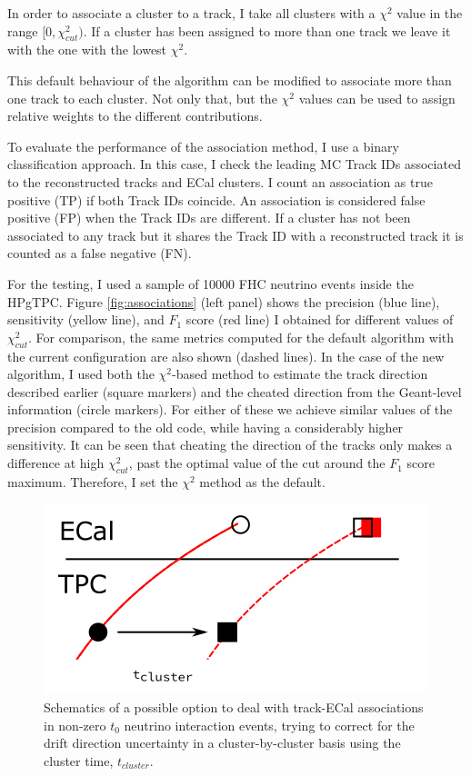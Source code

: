 In order to associate a cluster to a track, I take all clusters with a $\chi^{2}$ value in the range $[0, \chi^{2}_{cut})$. If a cluster has been assigned to more than one track we leave it with the one with the lowest $\chi^{2}$.

This default behaviour of the algorithm can be modified to associate more than one track to each cluster. Not only that, but the $\chi^{2}$ values can be used to assign relative weights to the different contributions.

To evaluate the performance of the association method, I use a binary classification approach. In this case, I check the leading MC Track IDs associated to the reconstructed tracks and ECal clusters. I count an association as true positive (TP) if both Track IDs coincide. An association is considered false positive (FP) when the Track IDs are different. If a cluster has not been associated to any track but it shares the Track ID with a reconstructed track it is counted as a false negative (FN).

For the testing, I used a sample of 10000 FHC neutrino events inside the HPgTPC. Figure \ref{fig:associations} (left panel) shows the precision (blue line), sensitivity (yellow line), and $F_{1}$ score (red line) I obtained for different values of $\chi^{2}_{cut}$. For comparison, the same metrics computed for the default algorithm with the current configuration are also shown (dashed lines). In the case of the new algorithm, I used both the $\chi^{2}$-based method to estimate the track direction described earlier (square markers) and the cheated direction from the Geant-level information (circle markers). For either of these we achieve similar values of the precision compared to the old code, while having a considerably higher sensitivity. It can be seen that cheating the direction of the tracks only makes a difference at high $\chi^{2}_{cut}$, past the optimal value of the cut around the $F_{1}$ score maximum. Therefore, I set the $\chi^{2}$ method as the default.

\begin{figure}[t]
	\centering
	\includegraphics[width=.55\linewidth]{Images/GArSoft_PID/associations/drift_correction.png}
	\caption{Schematics of a possible option to deal with track-ECal associations in non-zero $t_{0}$ neutrino interaction events, trying to correct for the drift direction uncertainty in a cluster-by-cluster basis using the cluster time, $t_{cluster}$.}
	\label{fig:associations_drift}
\end{figure}

